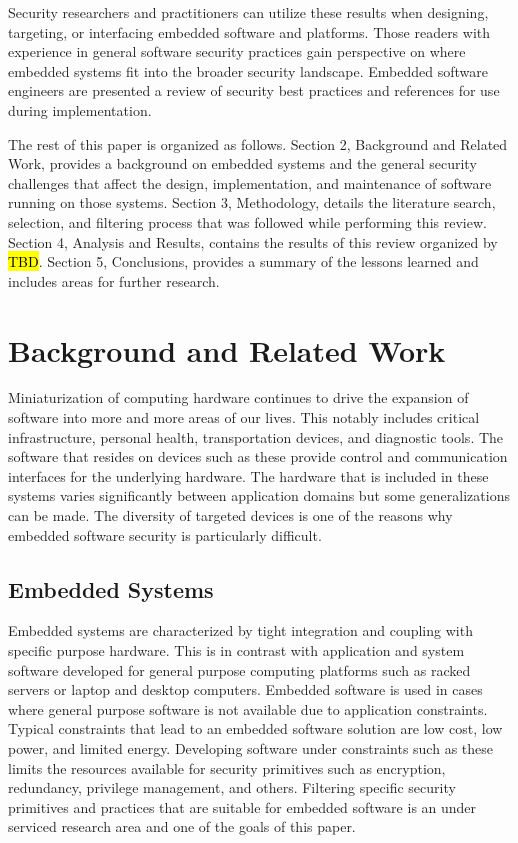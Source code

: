 \documentclass[final]{article}
\begin{document}
Security researchers and practitioners can utilize these results when designing, targeting, or interfacing embedded software and platforms.  Those readers with experience in general software security practices gain perspective on where embedded systems fit into the broader security landscape.  Embedded software engineers are presented a review of security best practices and references for use during implementation.

The rest of this paper is organized as follows. Section 2, Background and Related Work, provides a background on embedded systems and the general security challenges that affect the design, implementation, and maintenance of software running on those systems. Section 3, Methodology, details the literature search, selection, and filtering process that was followed while performing this review. Section 4, Analysis and Results, contains the results of this review organized by \hl{TBD}. Section 5, Conclusions, provides a summary of the lessons learned and includes areas for further research.

\section{Background and Related Work}
Miniaturization of computing hardware continues to drive the expansion of software into more and more areas of our lives.  This notably includes critical infrastructure, personal health, transportation devices, and diagnostic tools.  The software that resides on devices such as these provide control and communication interfaces for the underlying hardware.  The hardware that is included in these systems varies significantly between application domains but some generalizations can be made.  The diversity of targeted devices is one of the reasons why embedded software security is particularly difficult.

\subsection{Embedded Systems}

Embedded systems are characterized by tight integration and coupling with specific purpose hardware.  This is in contrast with application and system software developed for general purpose computing platforms such as racked servers or laptop and desktop computers.  Embedded software is used in cases where general purpose software is not available due to application constraints.  Typical constraints that lead to an embedded software solution are low cost, low power, and limited energy. Developing software under constraints such as these limits the resources available for security primitives such as encryption, redundancy, privilege management, and others.  Filtering specific security primitives and practices that are suitable for embedded software is an under serviced research area and one of the goals of this paper.
\end{document}
